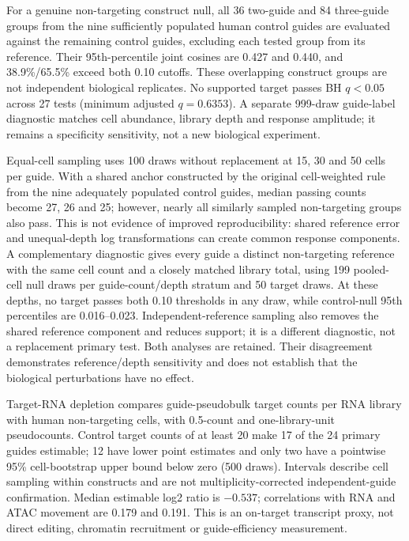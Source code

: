 \documentclass[a4paper,fleqn]{cas-sc}
\makeatletter
\DeclareRobustCommand{\rev}[1]{{\color{red}\def\@citecolor{black}\def\@linkcolor{red}\def\@urlcolor{red}#1}}
\makeatother
\begin{document}
For a genuine non-targeting construct null, all 36 two-guide and 84 three-guide groups from the nine sufficiently populated human control guides are evaluated against the remaining control guides, excluding each tested group from its reference. Their 95th-percentile joint cosines are 0.427 and 0.440, and 38.9\%/65.5\% exceed both 0.10 cutoffs. These overlapping construct groups are not independent biological replicates. \rev{No supported target passes BH $q<0.05$ across 27 tests (minimum adjusted $q=0.6353$).} A separate 999-draw guide-label diagnostic matches cell abundance, library depth and response amplitude; it remains a specificity sensitivity, not a new biological experiment.

Equal-cell sampling uses 100 draws without replacement at 15, 30 and 50 cells per guide. With a shared anchor constructed by the original cell-weighted rule from the nine adequately populated control guides, median passing counts become 27, 26 and 25; however, nearly all similarly sampled non-targeting groups also pass. This is not evidence of improved reproducibility: shared reference error and unequal-depth log transformations can create common response components. A complementary diagnostic gives every guide a distinct non-targeting reference with the same cell count and a closely matched library total, using 199 pooled-cell null draws per guide-count/depth stratum and 50 target draws. At these depths, no target passes both 0.10 thresholds in any draw, while control-null 95th percentiles are 0.016--0.023. Independent-reference sampling also removes the shared reference component and reduces support; it is a different diagnostic, not a replacement primary test. Both analyses are retained. Their disagreement demonstrates reference/depth sensitivity and does not establish that the biological perturbations have no effect.

Target-RNA depletion compares guide-pseudobulk target counts per RNA library with human non-targeting cells, with 0.5-count and one-library-unit pseudocounts. Control target counts of at least 20 make 17 of the 24 primary guides estimable; 12 have lower point estimates and only two have a pointwise 95\% cell-bootstrap upper bound below zero (500 draws). Intervals describe cell sampling within constructs and are not multiplicity-corrected independent-guide confirmation. Median estimable log2 ratio is $-0.537$; correlations with RNA and ATAC movement are 0.179 and 0.191. This is an on-target transcript proxy, not direct editing, chromatin recruitment or guide-efficiency measurement.
\end{document}
